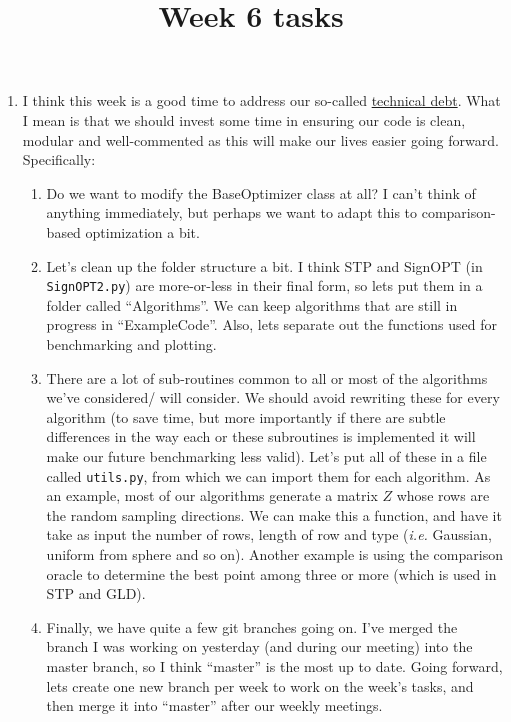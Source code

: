 \documentclass[12pt]{article}
\title{Week 6 tasks}
\begin{document}
\maketitle

\begin{enumerate}
	\item I think this week is a good time to address our so-called \href{https://en.wikipedia.org/wiki/Technical_debt}{technical debt}. What I mean is that we should invest some time in ensuring our code is clean, modular and well-commented as this will make our lives easier going forward. Specifically:
		\begin{enumerate}
			\item Do we want to modify the BaseOptimizer class at all? I can't think of anything immediately, but perhaps we want to adapt this to comparison-based optimization a bit. 
			\item Let's clean up the folder structure a bit. I think STP and SignOPT (in {\tt SignOPT2.py}) are more-or-less in their final form, so lets put them in a folder called ``Algorithms''. We can keep algorithms that are still in progress in ``ExampleCode''. Also, lets separate out the functions used for benchmarking and plotting.
			\item There are a lot of sub-routines common to all or most of the algorithms we've considered/ will consider. We should avoid rewriting these for every algorithm (to save time, but more importantly if there are subtle differences in the way each or these subroutines is implemented it will make our future benchmarking less valid). Let's put all of these in a file called {\tt utils.py}, from which we can import them for each algorithm. As an example, most of our algorithms generate a matrix $Z$ whose rows are the random sampling directions. We can make this a function, and have it take as input the number of rows, length of row and type ({\em i.e.} Gaussian, uniform from sphere and so on). Another example is using the comparison oracle to determine the best point among three or more (which is used in STP and GLD).
			\item Finally, we have quite a few git branches going on. I've merged the branch I was working on yesterday (and during our meeting) into the master branch, so I think ``master'' is the most up to date. Going forward, lets create one new branch per week to work on the week's tasks, and then merge it into ``master'' after our weekly meetings.  
		\end{enumerate}
		

\end{enumerate}
\end{document}

